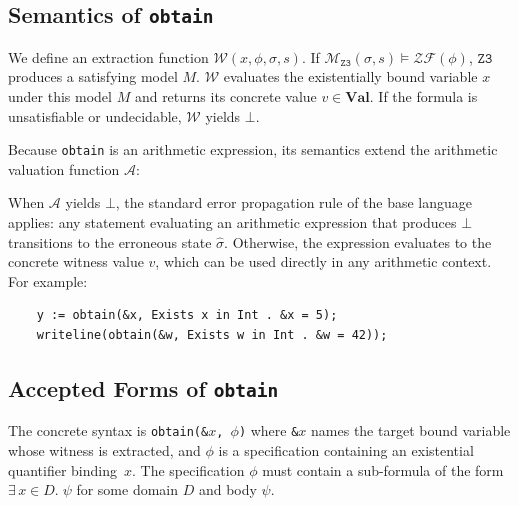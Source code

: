 \documentclass{article}
\begin{document}
\subsection{Semantics of \texttt{obtain}}
We define an extraction function $\mathcal{W}(x, \phi, \sigma, s)$. If $\mathcal{M}_{\mathtt{Z3}}(\sigma, s) \models \mathcal{ZF}(\phi)$, $\mathtt{Z3}$ produces a satisfying model $M$. $\mathcal{W}$ evaluates the existentially bound variable $x$ under this model $M$ and returns its concrete value $v \in \textbf{Val}$. If the formula is unsatisfiable or undecidable, $\mathcal{W}$ yields $\bot$.

Because \texttt{obtain} is an arithmetic expression, its semantics extend the arithmetic valuation function $\mathcal{A}$:

\begin{table}[!ht]
\centering
\renewcommand{\arraystretch}{1.6} 
\large
{}
\caption{Extension of $\mathcal{A}$ for witness extraction}
\end{table}

When $\mathcal{A}$ yields $\bot$, the standard error propagation rule of the base language applies: any statement evaluating an arithmetic expression that produces $\bot$ transitions to the erroneous state $\hat{\sigma}$. Otherwise, the expression evaluates to the concrete witness value $v$, which can be used directly in any arithmetic context. For example:
\begin{verbatim}
    y := obtain(&x, Exists x in Int . &x = 5);
    writeline(obtain(&w, Exists w in Int . &w = 42));
\end{verbatim}

\subsection{Accepted Forms of \texttt{obtain}}

The concrete syntax is \texttt{obtain(\&$x$, $\phi$)} where \texttt{\&$x$} names the target bound variable whose witness is extracted, and $\phi$ is a specification containing an existential quantifier binding~$x$. The specification $\phi$ must contain a sub-formula of the form $\exists\, x \in D.\; \psi$ for some domain $D$ and body $\psi$.
\end{document}
